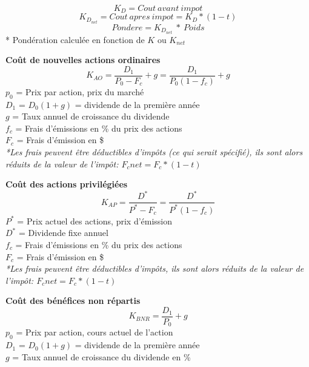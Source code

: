 \begin{RoundBox}
$$K_D = Cout\ avant\ impot$$
$$K_{D_{net}} = Cout\ apres\ impot = K_D * (1-t)$$
$$Pondere = K_{D_{net}}\ *\ Poids$$
{\scriptsize
* Pondération calculée en fonction de $K$ ou $K_{net}$
}
\end{RoundBox}

\begin{RoundBox}
    \textbf{Coût de nouvelles actions ordinaires}\\
    $$K_{AO}=\frac{D_1}{P_0 - F_c}+g = \frac{D_1}{P_0(1-f_c)}+g$$
    {\scriptsize
    $p_0$ = Prix par action, prix du marché \\
    $D_1$ = $D_0(1+g)$ = dividende de la première année \\
    $g$ = Taux annuel de croissance du dividende \\
    $f_c$ = Frais d'émissions en \% du prix des actions \\
    $F_c$ = Frais d'émission en \$\\
    \textit{*Les frais peuvent être déductibles d'impôts (ce qui serait spécifié), ils sont alors réduits de la valeur de l'impôt: $F_c net = F_c * (1-t)$}
}
\end{RoundBox}

\begin{RoundBox}
\textbf{Coût des actions privilégiées}\\
$$K_{AP}=\frac{D^*}{P^*-F_c}=\frac{D^*}{P^*(1-f_c)}$$
{\scriptsize
    $P^*$ = Prix actuel des actions, prix d'émission \\
    $D^*$ = Dividende fixe annuel \\
    $f_c$ = Frais d'émissions en \% du prix des actions \\
    $F_c$ = Frais d'émission en \$\\
    \textit{*Les frais peuvent être déductibles d'impôts, ils sont alors réduits de la valeur de l'impôt: $F_c net = F_c * (1-t)$}
}
\end{RoundBox}

\begin{RoundBox}
\textbf{Coût des bénéfices non répartis}\\
$$K_{BNR}=\frac{D_1}{P_0}+g$$
{\scriptsize
    $p_0$ = Prix par action, cours actuel de l'action \\
    $D_1$ = $D_0(1+g)$ = dividende de la première année \\
    $g$ = Taux annuel de croissance du dividende en \%
}
\end{RoundBox}

